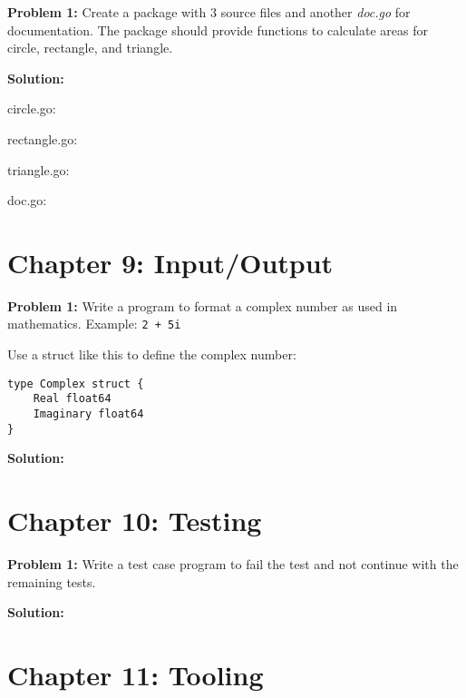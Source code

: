 {\bf Problem 1:} Create a package with 3 source files and
another \textit{doc.go} for documentation.  The package should provide
functions to calculate areas for circle, rectangle, and triangle.

\textbf{Solution:}

circle.go:



rectangle.go:



triangle.go:



doc.go:



\section*{Chapter 9: Input/Output}

\textbf{Problem 1:} Write a program to format a complex number as used in mathematics.  Example: \texttt{2 + 5i}

Use a struct like this to define the complex number:

\begin{lstlisting}[numbers=none]
type Complex struct {
    Real float64
    Imaginary float64
}
\end{lstlisting}

\textbf{Solution:}



\section*{Chapter 10: Testing}

\textbf{Problem 1:} Write a test case program to fail the test and not continue with the remaining tests.

\textbf{Solution:}



\section*{Chapter 11: Tooling}

